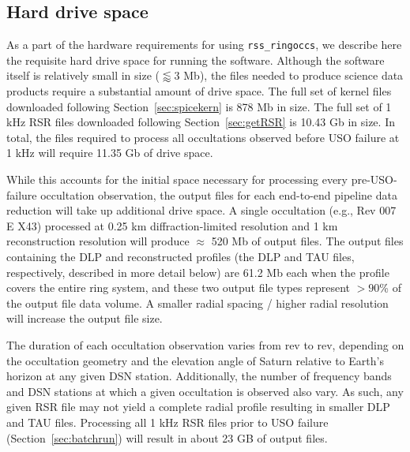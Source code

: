 \documentclass[titlepage, 12pt]{article}
\begin{document}
        \subsection{Hard drive space}
            As a part of the hardware requirements for using 
            \texttt{rss\_ringoccs}, we describe here the requisite 
            hard drive space for running the software.
            Although the software itself is relatively small in size
            ($\lessapprox{3}$ Mb), the files needed to produce science
            data products require a substantial amount of drive space.
            The full set of kernel files downloaded following
            Section~\ref{sec:spicekern} is 878 Mb in size. The full set of
            1 kHz RSR files downloaded following Section~\ref{sec:getRSR}
            is 10.43 Gb in size. In total, the files required to process
            all occultations observed before USO failure at 1 kHz
            will require 11.35 Gb of drive space.
            \par\hfill\par
            While this accounts for the initial space necessary for
            processing every pre-USO-failure occultation observation,
            the output files for each end-to-end pipeline data reduction
            will take up additional drive space. A single occultation
            (e.g., Rev 007 E X43) processed at 0.25 km diffraction-limited resolution and
            1 km reconstruction resolution will produce $\approx$ 520 Mb of
            output files. The output files containing the DLP 
            and reconstructed profiles (the DLP and TAU files,
            respectively, described in more detail below) are 61.2 Mb each when the profile
            covers the entire ring system, and these two output
            file types represent $>90$\% of the output file data
            volume. A smaller radial spacing / higher radial 
            resolution will increase the output file size. 
            \par\hfill\par
            The duration of each occultation observation varies
            from rev to rev, depending on the
            occultation geometry and the elevation angle of
            Saturn relative to Earth's horizon at any given DSN
            station. Additionally, the number of frequency bands and DSN 
            stations at which a given occultation is observed 
            also vary. As such, any given RSR file may not yield a
            complete radial profile resulting in smaller DLP 
            and TAU files. Processing all 1 kHz RSR files prior to 
            USO failure (Section~\ref{sec:batchrun}) will result in
           about 23 GB of output files.
            \par\hfill\par
\end{document}
